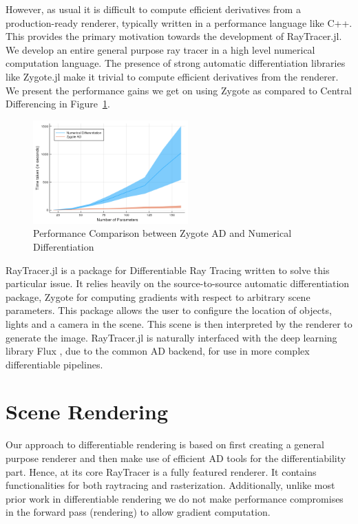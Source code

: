 \documentclass{juliacon}
\begin{document}
However, as usual it is difficult to compute efficient derivatives from a production-ready renderer, typically written in a performance language like C++. This provides the primary motivation towards the development of RayTracer.jl. We develop an entire general purpose ray tracer in a high level numerical computation language. The presence of strong automatic differentiation libraries like Zygote.jl make it trivial to compute efficient derivatives from the renderer. We present the performance gains we get on using Zygote as compared to Central Differencing in Figure~\ref{fig:ad_perf}.

\begin{figure}[!htb]
    \centering
    \includegraphics[width=\linewidth, height=150px]{images/differentiation.png}
    \caption{Performance Comparison between Zygote AD and Numerical Differentiation}
    \label{fig:ad_perf}
\end{figure}

RayTracer.jl \cite{RayTracer.jl} is a package for Differentiable Ray Tracing written to solve this particular issue. It relies heavily on the source-to-source automatic differentiation package, Zygote for computing gradients with respect to arbitrary scene parameters. This package allows the user to configure the location of objects, lights and a camera in the scene. This scene is then interpreted by the renderer to generate the image. RayTracer.jl is naturally interfaced with the deep learning library Flux \cite{Flux.jl-2018}, due to the common AD backend, for use in more complex differentiable pipelines.

\section{Scene Rendering}

Our approach to differentiable rendering is based on first creating a general purpose renderer and then make use of efficient AD tools for the differentiability part. Hence, at its core RayTracer is a fully featured renderer. It contains functionalities for both raytracing and rasterization. Additionally, unlike most prior work in differentiable rendering we do not make performance compromises in the forward pass (rendering) to allow gradient computation.
\end{document}
